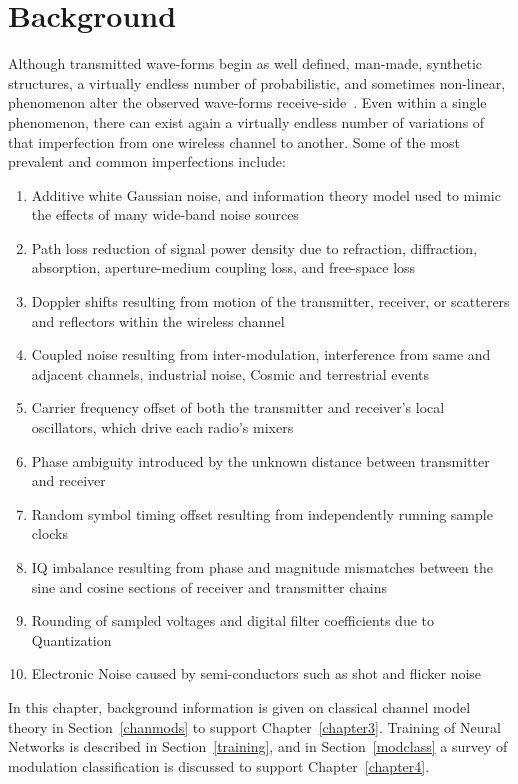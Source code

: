 \chapter{Background}
\label{chapter2}
Although transmitted wave-forms begin as well defined, man-made, synthetic structures, a virtually endless number of probabilistic, and sometimes non-linear, phenomenon alter the observed wave-forms receive-side~\cite{o2016radio}. Even within a single phenomenon, there can exist again a virtually endless number of variations of that imperfection from one wireless channel to another. Some of the most prevalent and common imperfections include:
\begin{enumerate}
	\item Additive white Gaussian noise, and information theory model used to mimic the effects of many wide-band noise sources
    \item Path loss reduction of signal power density due to refraction, diffraction, absorption, aperture-medium coupling loss, and free-space loss
    \item Doppler shifts resulting from motion of the transmitter, receiver, or scatterers and reflectors within the wireless channel
    \item Coupled noise resulting from inter-modulation, interference from same and adjacent channels, industrial noise, Cosmic and terrestrial events
	\item Carrier frequency offset of both the transmitter and receiver's local oscillators, which drive each radio's mixers
	\item Phase ambiguity introduced by the unknown distance between transmitter and receiver
	\item Random symbol timing offset resulting from independently running sample clocks
    \item IQ imbalance resulting from phase and magnitude mismatches between the sine and cosine sections of receiver and transmitter chains
    \item Rounding of sampled voltages and digital filter coefficients due to Quantization
    \item Electronic Noise caused by semi-conductors such as shot and flicker noise
\end{enumerate}
In this chapter, background information is given on classical channel model theory in Section~\ref{chanmods} to support Chapter~\ref{chapter3}. Training of Neural Networks is described in Section~\ref{training}, and in Section~\ref{modclass} a survey of modulation classification is discussed to support Chapter~\ref{chapter4}.

